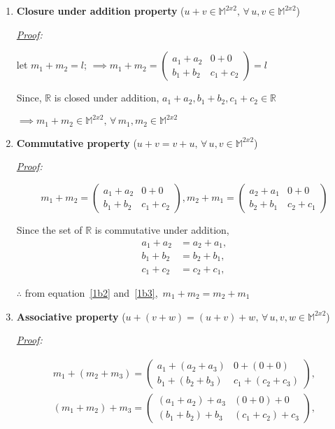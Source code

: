 \documentclass[12pt, letterpaper]{article}
\newcommand{\M}{\mathbb{M}^{2x2}}
\begin{document}
\begin{enumerate}

\item \textbf{Closure under addition property}
  ($u + v \in \M, \, \forall \, u, v \in \M$)

\textit{\underline{Proof}:}

  let $ m_1 + m_2 = l$;
  $\implies m_1 + m_2 = \begin{pmatrix}a_1 + a_2 &0 + 0\\b_1 + b_2 &c_1 + c_2\end{pmatrix} = l$ 

  Since, $\mathbb{R}$ is closed under addition, $a_1 + a_2, b_1 + b_2, c_1+c_2 \in \mathbb{R}$

  $\implies\boxed{m_1 + m_2 \in\M, \, \forall\, m_1,m_2 \in\M}$

\item \textbf{Commutative property}
  ($u + v = v + u, \, \forall \, u, v \in \M$)

\textit{\underline{Proof}:}

  \begin{equation}
  \label{1b2}
  m_1 + m_2 = \begin{pmatrix}a_1 + a_2&0 + 0\\b_1 + b_2&c_1 + c_2\end{pmatrix},
  m_2 + m_1 = \begin{pmatrix}a_2 + a_1&0 + 0\\b_2 + b_1&c_2 + c_1\end{pmatrix} 
  \end{equation}

  Since the set of $\mathbb{R}$ is commutative under addition,
  \begin{equation}
  \label{1b3}
  \begin{split}
    a_1 + a_2 &= a_2 + a_1,\\
    b_1 + b_2 &= b_2 + b_1,\\
    c_1 + c_2 &= c_2 + c_1,
  \end{split}
  \end{equation}

  $\therefore$ from equation~\ref{1b2} and~\ref{1b3},\,
  $\boxed{m_1 + m_2 = m_2 + m_1}$

\item \textbf{Associative property}
  ($u + (v + w) = (u + v) + w, \, \forall \, u, v, w \in \M$)

\textit{\underline{Proof}:}

  \begin{equation}
  \label{1b4}
  \begin{split}
  m_1 + (m_2 + m_3) = \begin{pmatrix}a_1 + (a_2 + a_3)&0 + (0 + 0)\\b_1 + (b_2 + b_3)&c_1 + (c_2 + c_3)\end{pmatrix},\\
  (m_1 + m_2) + m_3 = \begin{pmatrix}(a_1 + a_2) + a_3&(0 + 0) + 0\\(b_1 + b_2) + b_3&(c_1 + c_2) + c_3\end{pmatrix},
  \end{split}
  \end{equation}


\end{enumerate}
\end{document}

